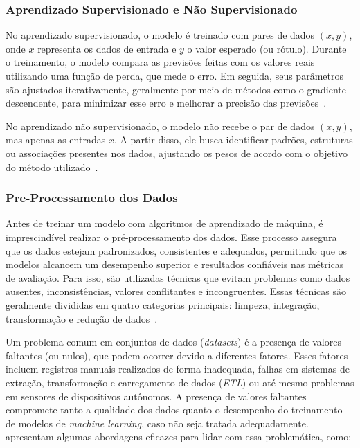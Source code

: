         \subsubsection{Aprendizado Supervisionado e Não Supervisionado}  
            No aprendizado supervisionado, o modelo é treinado com pares de dados \((x,y)\), onde \(x\) representa 
            os dados de entrada e \(y\) o valor esperado (ou rótulo). Durante o treinamento, o modelo compara as 
            previsões feitas com os valores reais utilizando uma função de perda, que mede o erro. Em seguida, 
            seus parâmetros são ajustados iterativamente, geralmente por meio de métodos como o gradiente descendente, 
            para minimizar esse erro e melhorar a precisão das previsões~\cite{ulinick2019}.
            
            No aprendizado não supervisionado, o modelo não recebe o par de dados \((x,y)\), mas apenas as entradas 
            \(x\). A partir disso, ele busca identificar padrões, estruturas ou associações presentes nos dados, 
            ajustando os pesos de acordo com o objetivo do método utilizado~\cite{ulinick2019}.

        
        \subsubsection{Pre-Processamento dos Dados}
            Antes de treinar um modelo com algoritmos de aprendizado de máquina, é imprescindível realizar o pré-processamento 
            dos dados. Esse processo assegura que os dados estejam padronizados, consistentes e adequados, permitindo que os 
            modelos alcancem um desempenho superior e resultados confiáveis nas métricas de avaliação. Para isso, são utilizadas 
            técnicas que evitam problemas como dados ausentes, inconsistências, valores conflitantes e incongruentes. Essas 
            técnicas são geralmente divididas em quatro categorias principais: limpeza, integração, transformação e redução de 
            dados~\cite{silva2021, oliveira2024}.

                Um problema comum em conjuntos de dados (\emph{datasets}) é a presença de valores faltantes (ou nulos), que 
                podem ocorrer devido a diferentes fatores. Esses fatores incluem registros manuais realizados de forma 
                inadequada, falhas em sistemas de extração, transformação e carregamento de dados (\emph{ETL}) ou até mesmo 
                problemas em sensores de dispositivos autônomos. A presença de valores faltantes compromete tanto a qualidade 
                dos dados quanto o desempenho do treinamento de modelos de \emph{machine learning}, caso não seja tratada 
                adequadamente.~ apresentam algumas abordagens eficazes para lidar com essa 
                problemática, como:

